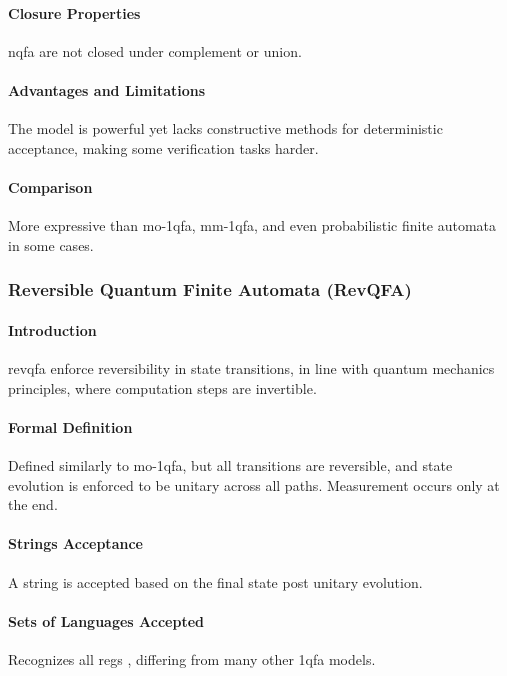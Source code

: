 \paragraph{Closure Properties}
\gls{nqfa} are not closed under complement or union.

\paragraph{Advantages and Limitations}
The model is powerful yet lacks constructive methods for deterministic acceptance, making some verification tasks harder.

\paragraph{Comparison}
More expressive than \gls{mo-1qfa}, \gls{mm-1qfa}, and even probabilistic finite automata in some cases.

\subsubsection{Reversible Quantum Finite Automata (RevQFA)}
\paragraph{Introduction}
\gls{revqfa} enforce reversibility in state transitions, in line with quantum mechanics principles, where computation steps are invertible.

\paragraph{Formal Definition}
Defined similarly to \gls{mo-1qfa}, but all transitions are reversible, and state evolution is enforced to be unitary across all paths. Measurement occurs only at the end.

\paragraph{Strings Acceptance}
A string is accepted based on the final state post unitary evolution.

\paragraph{Sets of Languages Accepted}
Recognizes all \glspl{reg} \cite{yamakami2014one}, differing from many other \gls{1qfa} models.

